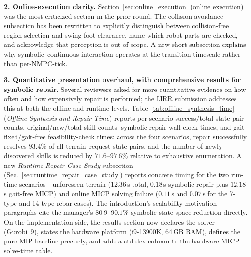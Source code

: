\noindent \textbf{2. Online-execution clarity.} Section~\ref{sec:online_execution} (online execution) was the most-criticized section in the prior round. The collision-avoidance subsection has been rewritten to explicitly distinguish between collision-free region selection and swing-foot clearance, name which robot parts are checked, and acknowledge that perception is out of scope. A new short subsection explains why symbolic--continuous interaction operates at the transition timescale rather than per-NMPC-tick.

\noindent \textbf{3. Quantitative presentation overhaul, with comprehensive results for symbolic repair.} Several reviewers asked for more quantitative evidence on how often and how expensively repair is performed; the IJRR submission addresses this at both the offline and runtime levels. Table~\ref{tab:offline_synthesis_time} (\textit{Offline Synthesis and Repair Time}) reports per-scenario success/total state-pair counts, original/new/total skill counts, symbolic-repair wall-clock times, and gait-fixed/gait-free feasibility-check times: across the four scenarios, repair successfully resolves $93.4\%$ of all terrain--request state pairs, and the number of newly discovered skills is reduced by $71.6$--$97.6\%$ relative to exhaustive enumeration. A new \textit{Runtime Repair Case Study} subsection (Sec.~\ref{sec:runtime_repair_case_study}) reports concrete timing for the two run-time scenarios---unforeseen terrain ($12.36$\,s total, $0.18$\,s symbolic repair plus $12.18$\,s gait-free MICP) and online MICP solving failure ($0.11$\,s and $0.07$\,s for the 7-type and 14-type rebar cases). The introduction's scalability-motivation paragraphs cite the manager's $80.9$--$90.1\%$ symbolic state-space reduction directly. On the implementation side, the results section now declares the solver (Gurobi~9), states the hardware platform (i9-13900K, 64\,GB RAM), defines the pure-MIP baseline precisely, and adds a std-dev column to the hardware MICP-solve-time table.

